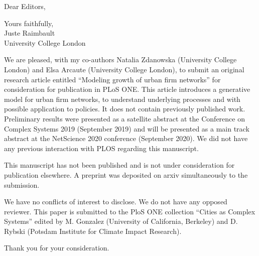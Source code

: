 \documentclass[11pt,a4paper,sans]{moderncv}        %
\begin{document}

\date{September 11th, 2020}
\opening{Dear Editors,}
\closing{Yours faithfully,\\
Juste Raimbault\\
University College London
}
\makelettertitle

\justify
We are pleased, with my co-authors Natalia Zdanowska (University College London) and Elsa Arcaute (University College London), to submit an original research article entitled ``Modeling growth of urban firm networks'' for consideration for publication in PLoS ONE. This article introduces a generative model for urban firm networks, to understand underlying processes and with possible application to policies. It does not contain previously published work. Preliminary results were presented as a satellite abstract at the Conference on Complex Systems 2019 (September 2019) and will be presented as a main track abstract at the NetScience 2020 conference (September 2020). We did not have any previous interaction with PLOS regarding this manuscript.

This manuscript has not been published and is not under consideration for publication elsewhere. A preprint was deposited on arxiv simultaneously to the submission.

We have no conflicts of interest to disclose. We do not have any opposed reviewer. This paper is submitted to the PloS ONE collection ``Cities as Complex Systems'' edited by M. Gonzalez (University of California, Berkeley) and D. Rybski (Potsdam Institute for Climate Impact Research).


Thank you for your consideration.
\justify




\makeletterclosing
\end{document}

